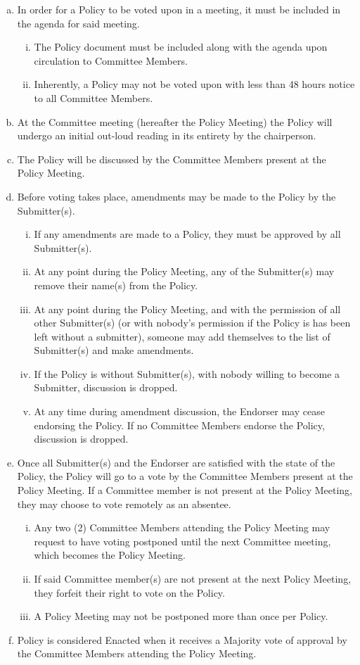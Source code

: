 \documentclass[a4paper,12pt]{article}
\begin{document}
\begin{enumerate}[a)]
	\item In order for a Policy to be voted upon in a meeting, it must be included in the agenda for said meeting.
	\begin{enumerate}[i)]
		\item The Policy document must be included along with the agenda upon circulation to Committee Members.
		\item Inherently, a Policy may not be voted upon with less than 48 hours notice to all Committee Members.
	\end{enumerate}
	\item At the Committee meeting (hereafter the Policy Meeting) the Policy will undergo an initial out-loud reading in its entirety by the chairperson.
	\item The Policy will be discussed by the Committee Members present at the Policy Meeting.
	\item Before voting takes place, amendments may be made to the Policy by the Submitter(s).
	\begin{enumerate}[i)]
		\item If any amendments are made to a Policy, they must be approved by all Submitter(s).
		\item At any point during the Policy Meeting, any of the Submitter(s) may remove their name(s) from the Policy.
		\item At any point during the Policy Meeting, and with the permission of all other Submitter(s) (or with nobody's permission if the Policy is has been left without a submitter), someone may add themselves to the list of Submitter(s) and make amendments.
		\item If the Policy is without Submitter(s), with nobody willing to become a Submitter, discussion is dropped.
		\item At any time during amendment discussion, the Endorser may cease endorsing the Policy. If no Committee Members endorse the Policy, discussion is dropped.
	\end{enumerate}
	\item Once all Submitter(s) and the Endorser are satisfied with the state of the Policy, the Policy will go to a vote by the Committee Members present at the Policy Meeting. If a Committee member is not present at the Policy Meeting, they may choose to vote remotely as an absentee.
	\begin{enumerate}[i)]
		\item Any two (2) Committee Members attending the Policy Meeting may request to have voting postponed until the next Committee meeting, which becomes the Policy Meeting.
		\item If said Committee member(s) are not present at the next Policy Meeting, they forfeit their right to vote on the Policy.
		\item A Policy Meeting may not be postponed more than once per Policy.
	\end{enumerate}
	\item Policy is considered Enacted when it receives a Majority vote of approval by the Committee Members attending the Policy Meeting.
\end{enumerate}
\end{document}
